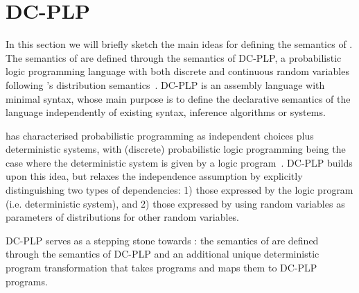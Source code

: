 
\section{DC-PLP}\label{sec:semantics}

In this section we will briefly sketch the main ideas for defining the semantics of \dcproblogsty.
The semantics of \dcproblogsty are defined through the semantics of DC-PLP, a probabilistic logic programming language with both discrete and continuous random variables following \citeauthor{sato1995statistical}'s distribution semantics~\citep{sato1995statistical}. DC-PLP is an assembly language with minimal syntax, whose main purpose is to define the declarative semantics of the language independently of existing syntax, inference algorithms or systems. 

\citet{poole2010probabilistic} has characterised probabilistic programming as independent choices plus deterministic systems, with (discrete) probabilistic logic programming being the case where the deterministic system is given by a logic program~\citep{poole2010probabilistic}. DC-PLP builds upon this idea, but relaxes the independence assumption by explicitly distinguishing two types of dependencies: 1) those expressed by the logic program (i.e.  deterministic system), and 2) those expressed by using random variables as parameters of distributions for other random variables. 

DC-PLP serves as a stepping stone towards \dcproblogsty: the semantics of \dcproblogsty are defined through the semantics of DC-PLP and an additional unique deterministic program transformation that takes \dcproblogsty programs and maps them to DC-PLP programs.




